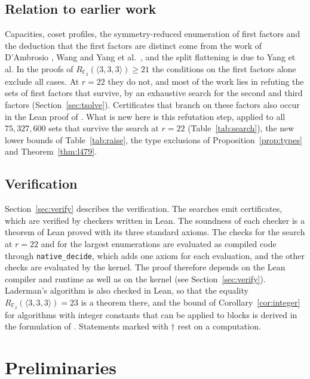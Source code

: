 \documentclass[11pt]{amsart}
\theoremstyle{definition}
\theoremstyle{remark}
\numberwithin{equation}{section}
\newcommand{\F}{\mathbb{F}_2}
\newcommand{\mm}{\langle 3,3,3\rangle}
\begin{document}
\subsection*{Relation to earlier work}
Capacities, coset profiles, the symmetry-reduced enumeration of first factors and the deduction that the first factors are distinct come from the work of D'Ambrosio \cite{DAm26}, Wang \cite{Wan26a,Wan26b} and Yang et al.\ \cite{Yan26}, and the split flattening is due to Yang et al. In the proofs of $R_{\F}(\mm)\ge 21$ the conditions on the first factors alone exclude all cases. At $r=22$ they do not, and most of the work lies in refuting the sets of first factors that survive, by an exhaustive search for the second and third factors (Section~\ref{sec:tsolve}). Certificates that branch on these factors also occur in the Lean proof of \cite{RR26}. What is new here is this refutation step, applied to all $75{,}327{,}600$ sets that survive the search at $r=22$ (Table~\ref{tab:search}), the new lower bounds of Table~\ref{tab:raise}, the type exclusions of Proposition~\ref{prop:types} and Theorem~\ref{thm:l479}.

\subsection*{Verification}
Section~\ref{sec:verify} describes the verification. The searches emit certificates, which are verified by checkers written in Lean. The soundness of each checker is a theorem of Lean proved with its three standard axioms. The checks for the search at $r=22$ and for the largest enumerations are evaluated as compiled code through \texttt{native\_decide}, which adds one axiom for each evaluation, and the other checks are evaluated by the kernel. The proof therefore depends on the Lean compiler and runtime as well as on the kernel (see Section~\ref{sec:verify}). Laderman's algorithm is also checked in Lean, so that the equality $R_{\F}(\mm)=23$ is a theorem there, and the bound of Corollary~\ref{cor:integer} for algorithms with integer constants that can be applied to blocks is derived in the formulation of \cite{RR26}. Statements marked with $\dagger$ rest on a computation.

\section{Preliminaries}\label{sec:prelim}
\end{document}
